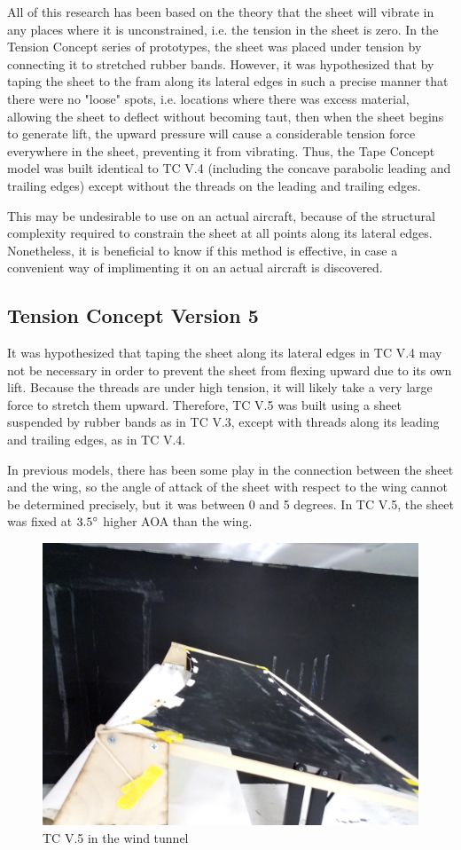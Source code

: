 \documentclass[12pt]{report} %
\begin{document}
All of this research has been based on the theory that the sheet will vibrate in any places where it is unconstrained, i.e. the tension
in the sheet is zero. In the Tension Concept series of prototypes, the sheet was placed under tension by connecting it to stretched
rubber bands. However, it was hypothesized that by taping the sheet to the fram along its lateral edges in such a precise manner that there
were no "loose" spots, i.e. locations where there was excess material, allowing the sheet to deflect without becoming taut, then when the sheet
begins to generate lift, the upward pressure will cause a considerable tension force everywhere in the sheet, preventing it from vibrating. Thus,
the Tape Concept model was built identical to TC V.4 (including the concave parabolic leading and trailing edges) except without the threads on
the leading and trailing edges.

This may be undesirable to use on an actual aircraft, because of the structural complexity required to constrain the sheet at all points along
its lateral edges. Nonetheless, it is beneficial to know if this method is effective, in case a convenient way of implimenting it on an actual
aircraft is discovered.

\subsection{Tension Concept Version 5}

It was hypothesized that taping the sheet along its lateral edges in TC V.4 may not be necessary in order to prevent the sheet from flexing upward
due to its own lift. Because the threads are under high tension, it will likely take a very large force to stretch them upward. Therefore, TC V.5
was built using a sheet suspended by rubber bands as in TC V.3, except with threads along its leading and trailing edges, as in TC V.4.

In previous models, there has been some play in the connection between the sheet and the wing, so the angle of attack of the sheet with respect
to the wing cannot be determined precisely, but it was between 0 and 5 degrees. In TC V.5, the sheet was fixed at $3.5\degree$ higher AOA than
the wing.

\begin{figure}
\includegraphics[width = 0.5\linewidth]{tcv5.jpg}
\caption{TC V.5 in the wind tunnel}
\label{tcv5}
\end{figure}
\end{document}
